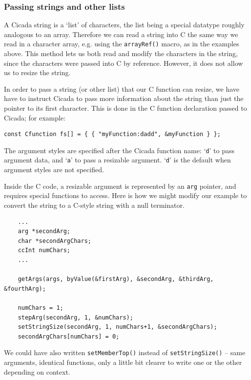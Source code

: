 \documentclass{article}
\newenvironment{code}{
       \begin{list}{}{
               \setlength{\leftmargin}{.4in}
               \setlength{\rightmargin}{0in}
               \setlength{\topsep}{.2in}
       }
       \small
       \item[] }
       { \end{list}   }
\begin{document}
\subsubsection{Passing strings and other lists}

A Cicada string is a `list' of characters, the list being a special datatype roughly analogous to an array.  Therefore we can read a string into C the same way we read in a character array, e.g. using the \verb#arrayRef()# macro, as in the examples above.  This method lets us both read and modify the characters in the string, since the characters were passed into C by reference.  However, it does not allow us to resize the string.

In order to pass a string (or other list) that our C function can resize, we have have to instruct Cicada to pass more information about the string than just the pointer to its first character.  This is done in the C function declaration passed to Cicada; for example:

\begin{code} \begin{verbatim}
const Cfunction fs[] = { { "myFunction:dadd", &myFunction } };
\end{verbatim} \end{code}

\noindent The argument styles are specified after the Cicada function name:  `\verb#d#' to pass argument data, and `\verb#a#' to pass a resizable argument.  `\verb#d#' is the default when argument styles are not specified.

Inside the C code, a resizable argument is represented by an \verb#arg# pointer, and requires special functions to access.  Here is how we might modify our example to convert the string to a C-style string with a null terminator.

\begin{code} \begin{verbatim}
    ...
    arg *secondArg;
    char *secondArgChars;
    ccInt numChars;
    ...
    
    getArgs(args, byValue(&firstArg), &secondArg, &thirdArg, &fourthArg);
    
    numChars = 1;
    stepArg(secondArg, 1, &numChars);
    setStringSize(secondArg, 1, numChars+1, &secondArgChars);
    secondArgChars[numChars] = 0;
\end{verbatim} \end{code}

\noindent We could have also written \verb#setMemberTop()# instead of \verb#setStringSize()# -- same arguments, identical functions, only a little bit clearer to write one or the other depending on context.
\end{document}
